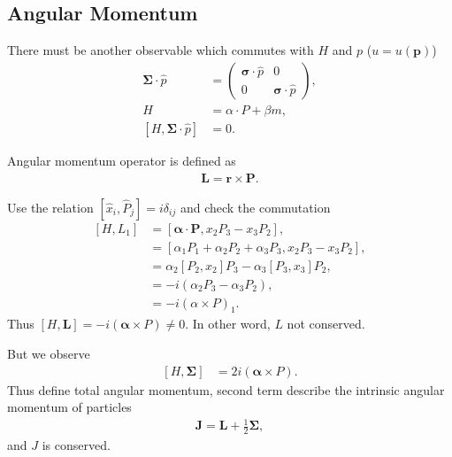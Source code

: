 
\subsection{Angular Momentum}
There must be another observable which commutes with $H$ and $p$ ($u = u(\pmb{p})$)
\begin{align}
   \pmb{\Sigma} \cdot \hat{p} &= \begin{pmatrix} \pmb{\sigma} \cdot \hat{p} & 0 \\ 0 &\pmb{\sigma} \cdot \hat{p} \end{pmatrix}, \\
   H &= \alpha \cdot P + \beta m, \\
   \left[ H, \pmb{\Sigma} \cdot \hat{p} \right] &= 0.
\end{align}

Angular momentum operator is defined as 
\begin{align}
   \pmb{L} = \pmb{r} \times \pmb{P}.
\end{align}

Use the relation $\left[ \hat{x}_i, \hat{P}_j \right] = i \delta_{ij}$ and check the commutation
\begin{align*}
   \left[ H, L_1 \right] &= \left[ \pmb{\alpha} \cdot \pmb{P}, x_2 P_3 - x_3 P_2 \right], \\
                         &= \left[ \alpha_1 P_1 + \alpha_2 P_2 + \alpha_3 P_3, x_2 P_3  - x_3 P_2 \right], \\
                         &= \alpha_2 \left[ P_2, x_2 \right] P_3 - \alpha_3 \left[ P_3, x_3 \right] P_2,  \\
                         &= -i \left( \alpha_2 P_3 - \alpha_3 P_2 \right), \\
                         &= -i (\alpha \times P)_1.
\end{align*}
Thus $ \left[ H, \pmb{L} \right] = -i (\pmb{\alpha} \times P) \neq 0$. In other word, $L$ not conserved.

But we observe
\begin{align}
   \left[ H, \pmb{\Sigma} \right] &= 2i(\pmb{\alpha} \times P).
\end{align}
Thus define total angular momentum, second term describe the intrinsic angular momentum of particles
\begin{align}
   \pmb{J} = \pmb{L} + \frac{1}{2} \pmb{\Sigma},
\end{align}
and $J$ is conserved.

